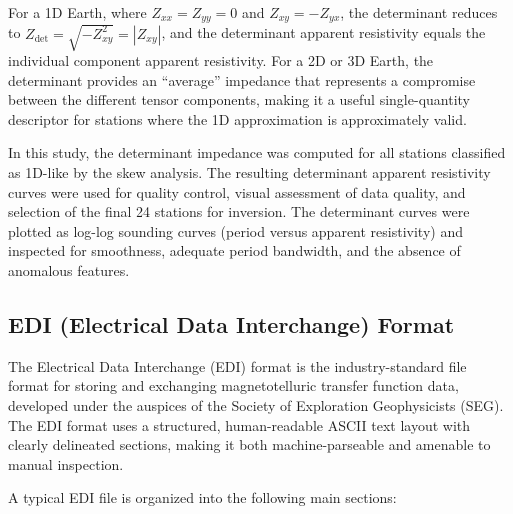 For a 1D Earth, where $Z_{xx} = Z_{yy} = 0$ and $Z_{xy} = -Z_{yx}$, the determinant reduces to $Z_{\text{det}} = \sqrt{-Z_{xy}^2} = |Z_{xy}|$, and the determinant apparent resistivity equals the individual component apparent resistivity. For a 2D or 3D Earth, the determinant provides an ``average'' impedance that represents a compromise between the different tensor components, making it a useful single-quantity descriptor for stations where the 1D approximation is approximately valid.

In this study, the determinant impedance was computed for all stations classified as 1D-like by the skew analysis. The resulting determinant apparent resistivity curves were used for quality control, visual assessment of data quality, and selection of the final 24 stations for inversion. The determinant curves were plotted as log-log sounding curves (period versus apparent resistivity) and inspected for smoothness, adequate period bandwidth, and the absence of anomalous features.

\subsection{EDI (Electrical Data Interchange) Format}

The Electrical Data Interchange (EDI) format is the industry-standard file format for storing and exchanging magnetotelluric transfer function data, developed under the auspices of the Society of Exploration Geophysicists (SEG). The EDI format uses a structured, human-readable ASCII text layout with clearly delineated sections, making it both machine-parseable and amenable to manual inspection.

A typical EDI file is organized into the following main sections:

